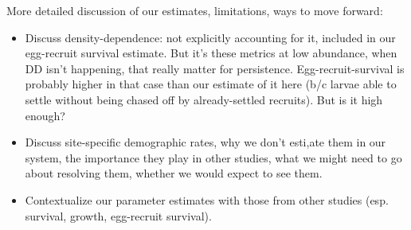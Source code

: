 \documentclass[12pt, oneside]{article}   	%
\begin{document}
More detailed discussion of our estimates, limitations, ways to move forward:
\begin{itemize}
	\item Discuss density-dependence: not explicitly accounting for it, included in our egg-recruit survival estimate. But it's these metrics at low abundance, when DD isn't happening, that really matter for persistence. Egg-recruit-survival is probably higher in that case than our estimate of it here (b/c larvae able to settle without being chased off by already-settled recruits). But is it high enough?
	\item Discuss site-specific demographic rates, why we don't esti,ate them in our system, the importance they play in other studies, what we might need to go about resolving them, whether we would expect to see them.
	\item Contextualize our parameter estimates with those from other studies (esp. survival, growth, egg-recruit survival).

\end{itemize}
\end{document}
